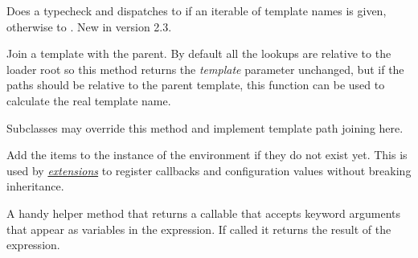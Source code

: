 \documentclass[a4paper,10pt,english]{sphinxmanual}
\begin{document}
\begin{fulllineitems}

\begin{fulllineitems}
\label{api:jinja2.Environment.get_or_select_template}
Does a typecheck and dispatches to {\hyperref[api:jinja2.Environment.select_template]{}}
if an iterable of template names is given, otherwise to
{\hyperref[api:jinja2.Environment.get_template]{}}.
New in version 2.3.
\end{fulllineitems}


\begin{fulllineitems}
\label{api:jinja2.Environment.join_path}
Join a template with the parent.  By default all the lookups are
relative to the loader root so this method returns the \emph{template}
parameter unchanged, but if the paths should be relative to the
parent template, this function can be used to calculate the real
template name.

Subclasses may override this method and implement template path
joining here.

\end{fulllineitems}


\begin{fulllineitems}
\label{api:jinja2.Environment.extend}
Add the items to the instance of the environment if they do not exist
yet.  This is used by {\hyperref[extensions:writing-extensions]{\emph{extensions}}} to register
callbacks and configuration values without breaking inheritance.

\end{fulllineitems}


\begin{fulllineitems}
\label{api:jinja2.Environment.compile_expression}
A handy helper method that returns a callable that accepts keyword
arguments that appear as variables in the expression.  If called it
returns the result of the expression.


\end{fulllineitems}
\end{fulllineitems}
\end{document}
